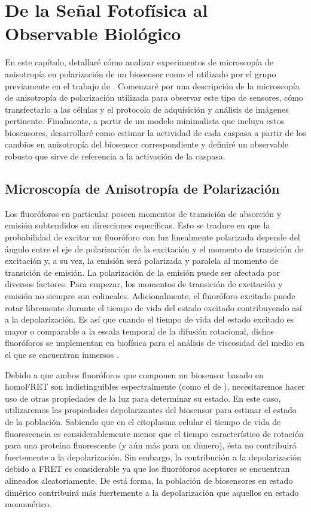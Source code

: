 \chapter{De la Señal Fotofísica al Observable Biológico}
\label{cap:MatMet}


En este capítulo, detallaré cómo analizar experimentos de microscopía de anisotropía en polarización de un biosensor como el utilizado por el grupo previamente en el trabajo de \cite{Stegemann2015}. Comenzaré por una descripción de la microscopía de anisotropía de polarización utilizada para observar este tipo de sensores, cómo transfectarlo a las células y el protocolo de adquisición y análisis de imágenes pertinente. Finalmente, a partir de un modelo minimalista que incluya estos biosensores, desarrollaré como estimar la actividad de cada caspasa a partir de los cambios en anisotropía del biosensor correspondiente y definiré un observable robusto que sirve de referencia a la activación de la caspasa.



\section{Microscopía de Anisotropía de Polarización}


Los fluoróforos en particular poseen momentos de transición de absorción y emisión subtendidos en direcciones específicas. Esto se traduce en que la probabilidad de excitar un fluoróforo con luz linealmente polarizada depende del ángulo entre el eje de polarización de la excitación y el momento de transición de excitación y, a su vez, la emisión será polarizada y paralela al momento de transición de emisión. La polarización de la emisión puede ser afectada por diversos factores. Para empezar, los momentos de transición de excitación y emisión no siempre son colineales. Adicionalmente, el fluoróforo excitado puede rotar libremente durante el tiempo de vida del estado excitado contribuyendo así a la depolarización. Es así que cuando el tiempo de vida del estado excitado es mayor o comparable a la escala temporal de la difusión rotacional, dichos fluoróforos se implementan en biofísica para el análisis de viscosidad del medio en el que se encuentran inmersos \citep{Lakowicz2006}.

Debido a que ambos fluoróforos que componen un biosensor basado en homoFRET son indistinguibles espectralmente (como el de \cite{Stegemann2015}), necesitaremos hacer uso de otras propiedades de la luz para determinar su estado. En este caso, utilizaremos las propiedades depolarizantes del biosensor para estimar el estado de la población. Sabiendo que en el citoplasma celular el tiempo de vida de fluorescencia es considerablemente menor que el tiempo característico de rotación para una proteína fluorescente (y aún más para un dímero), ésta no contribuirá fuertemente a la depolarización. Sin embargo, la contribución a la depolarización debido a FRET es considerable ya que los fluoróforos aceptores se encuentran alineados aleatoriamente. De está forma, la población de biosensores en estado dimérico contribuirá más fuertemente a la depolarización que aquellos en estado monomérico.

